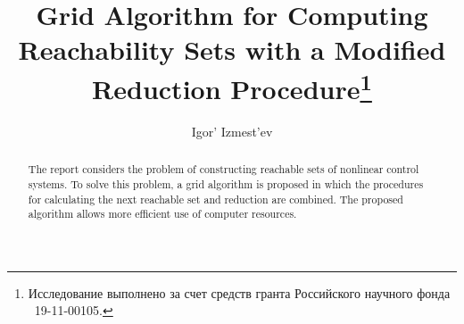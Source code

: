\begin{englishtitle} %
\title{Grid Algorithm for Computing Reachability Sets with a Modified Reduction Procedure\thanks{Исследование выполнено за счет средств гранта Российского научного фонда \textnumero~19-11-00105.}}
\author{Igor' Izmest'ev
}

\maketitle

\begin{abstract}
The report considers the problem of constructing reachable sets of nonlinear control systems. To solve this problem, a grid algorithm is proposed in which the procedures for calculating the next reachable set and reduction are combined. The proposed algorithm allows more efficient use of computer resources.

\end{abstract}
\end{englishtitle}

\iffalse



%
%


